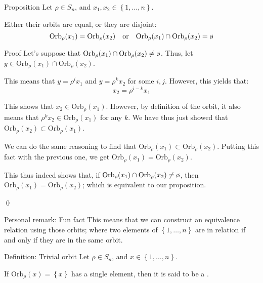\documentclass[a4paper]{article}
\begin{document}
\begin{parag}{Proposition}
    Let $\rho \in S_n$, and $x_1, x_2 \in \left\{1, \ldots, n\right\}$.

    Either their orbits are equal, or they are disjoint:
    \[\text{Orb}_{\rho}\left(x_1\right) = \text{Orb}_{\rho}\left(x_2\right) \mathspace \text{or} \mathspace \text{Orb}_{\rho}\left(x_1\right) \cap \text{Orb}_{\rho}\left(x_2\right) = \o\]

    \begin{subparag}{Proof}
        Let's suppose that $\text{Orb}_{\rho}\left(x_1\right) \cap \text{Orb}_{\rho}\left(x_2\right) \neq \o$. Thus, let $y \in \text{Orb}_{\rho}\left(x_1\right) \cap \text{Orb}_{\rho}\left(x_2\right)$.

        This means that $y = \rho^i x_1$ and $y = \rho^k x_2$ for some $i, j$. However, this yields that: 
        \[x_2 = \rho^{i - k}x_1\]
        
        This shows that $x_2 \in \text{Orb}_{\rho}\left(x_1\right)$. However, by definition of the orbit, it also means that $\rho^k x_2 \in \text{Orb}_{\rho}\left(x_1\right)$ for any $k$. We have thus just showed that $\text{Orb}_{\rho}\left(x_2\right) \subset \text{Orb}_{\rho}\left(x_1\right)$. 

        We can do the same reasoning to find that $\text{Orb}_{\rho}\left(x_1\right) \subset \text{Orb}_{\rho}\left(x_2\right)$. Putting this fact with the previous one, we get $\text{Orb}_{\rho}\left(x_1\right) = \text{Orb}_{\rho}\left(x_2\right)$.

        This thus indeed shows that, if $\text{Orb}_{\rho}\left(x_1\right) \cap \text{Orb}_{\rho}\left(x_2\right) \neq \o$, then $\text{Orb}_{\rho}\left(x_1\right) = \text{Orb}_{\rho}\left(x_2\right)$; which is equivalent to our proposition.

        \qed
    \end{subparag}

    \begin{subparag}{Personal remark: Fun fact}
        This means that we can construct an equivalence relation using those orbits; where two elements of $\left\{1, \ldots, n\right\}$ are in relation if and only if they are in the same orbit.
    \end{subparag}
\end{parag}

\begin{parag}{Definition: Trivial orbit}
    Let $\rho \in S_n$, and $x \in \left\{1, \ldots, n\right\}$.

    If $\text{Orb}_{\rho}\left(x\right) = \left\{x\right\}$ has a single element, then it is said to be a .
\end{parag}
\end{document}
